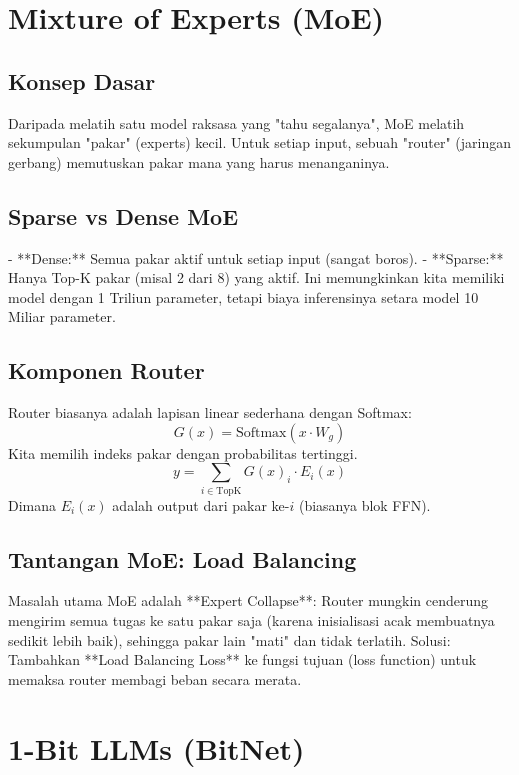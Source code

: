 \section{Mixture of Experts (MoE)}

\subsection{Konsep Dasar}
Daripada melatih satu model raksasa yang "tahu segalanya", MoE melatih sekumpulan "pakar" (experts) kecil. Untuk setiap input, sebuah "router" (jaringan gerbang) memutuskan pakar mana yang harus menanganinya.

\subsection{Sparse vs Dense MoE}
- **Dense:** Semua pakar aktif untuk setiap input (sangat boros).
- **Sparse:** Hanya Top-K pakar (misal 2 dari 8) yang aktif.
Ini memungkinkan kita memiliki model dengan 1 Triliun parameter, tetapi biaya inferensinya setara model 10 Miliar parameter.

\subsection{Komponen Router}
Router biasanya adalah lapisan linear sederhana dengan Softmax:
\begin{equation}
G(x) = \text{Softmax}(x \cdot W_g)
\end{equation}
Kita memilih indeks pakar dengan probabilitas tertinggi.
\begin{equation}
y = \sum_{i \in \text{TopK}} G(x)_i \cdot E_i(x)
\end{equation}
Dimana $E_i(x)$ adalah output dari pakar ke-$i$ (biasanya blok FFN).

\subsection{Tantangan MoE: Load Balancing}
Masalah utama MoE adalah **Expert Collapse**: Router mungkin cenderung mengirim semua tugas ke satu pakar saja (karena inisialisasi acak membuatnya sedikit lebih baik), sehingga pakar lain "mati" dan tidak terlatih.
Solusi: Tambahkan **Load Balancing Loss** ke fungsi tujuan (loss function) untuk memaksa router membagi beban secara merata.

\section{1-Bit LLMs (BitNet)}


